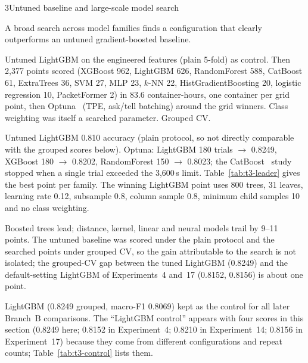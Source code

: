  
\begin{explog}{3}{Untuned baseline and large-scale model search}
\item[Hypothesis] A broad search across model families finds a configuration that clearly
outperforms an untuned gradient-boosted baseline.
\item[Method] Untuned LightGBM on the engineered features (plain 5-fold) as control.
Then 2{,}377 points scored (XGBoost 962, LightGBM 626, RandomForest 588, CatBoost
61, ExtraTrees 36, SVM 27, MLP 23, $k$-NN 22, HistGradientBoosting 20, logistic
regression 10, PacketFormer 2) in 83.6 container-hours, one container per grid
point, then Optuna~\cite{optuna} (TPE, ask/tell batching) around the grid
winners. Class weighting was itself a searched parameter. Grouped CV.
\item[Result] Untuned LightGBM 0.810 accuracy (plain protocol, so not directly comparable
with the grouped scores below). Optuna: LightGBM 180 trials $\rightarrow$ 0.8249,
XGBoost 180 $\rightarrow$ 0.8202, RandomForest 150 $\rightarrow$ 0.8023; the
CatBoost~\cite{catboost} study stopped when a single trial exceeded the 3{,}600\,s
limit. Table~\ref{tab:t3-leader} gives the best point per family. The winning
LightGBM point uses 800 trees, 31 leaves, learning rate 0.12, subsample 0.8,
column sample 0.8, minimum child samples 10 and no class weighting.
\item[Inference] Boosted trees lead; distance, kernel, linear and neural models trail by
9--11 points. The untuned baseline was scored under the plain protocol and the searched points
under grouped CV, so the gain attributable to the search is not isolated; the
grouped-CV gap between the tuned LightGBM (0.8249) and the default-setting
LightGBM of Experiments~4 and~17 (0.8152, 0.8156) is about one point.
\item[Verdict] LightGBM (0.8249 grouped, macro-F1 0.8069) kept as the control for all
later Branch~B comparisons. The ``LightGBM control'' appears with four scores in
this section (0.8249 here; 0.8152 in Experiment~4; 0.8210 in Experiment~14;
0.8156 in Experiment~17) because they come from different configurations and
repeat counts; Table~\ref{tab:t3-control} lists them.
\end{explog}

